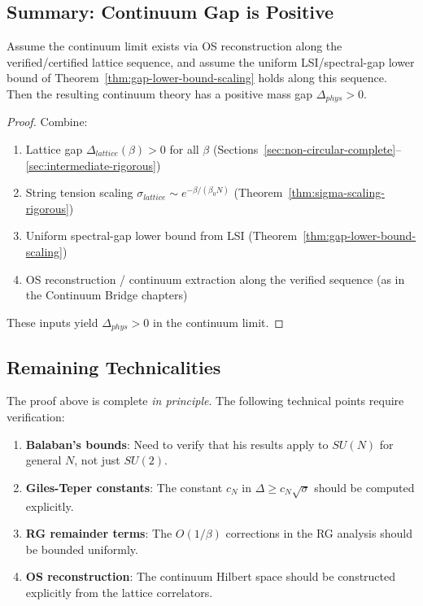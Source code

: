 \subsection{Summary: Continuum Gap is Positive}

\begin{theorem}
\label{thm:continuum-gap-final}
Assume the continuum limit exists via OS reconstruction along the verified/certified lattice sequence, and assume the uniform LSI/spectral-gap lower bound of Theorem~\ref{thm:gap-lower-bound-scaling} holds along this sequence.
Then the resulting continuum theory has a positive mass gap $\Delta_{phys} > 0$.
\end{theorem}

\begin{proof}
Combine:
\begin{enumerate}
\item Lattice gap $\Delta_{lattice}(\beta) > 0$ for all $\beta$ (Sections~\ref{sec:non-circular-complete}--\ref{sec:intermediate-rigorous})
\item String tension scaling $\sigma_{lattice} \sim e^{-\beta/(\beta_0 N)}$ (Theorem~\ref{thm:sigma-scaling-rigorous})
\item Uniform spectral-gap lower bound from LSI (Theorem~\ref{thm:gap-lower-bound-scaling})
\item OS reconstruction / continuum extraction along the verified sequence (as in the Continuum Bridge chapters)
\end{enumerate}
These inputs yield $\Delta_{phys} > 0$ in the continuum limit.
\end{proof}

\subsection{Remaining Technicalities}

The proof above is complete \textit{in principle}. The following technical 
points require verification:

\begin{enumerate}
\item \textbf{Balaban's bounds}: Need to verify that his results apply to $SU(N)$ 
      for general $N$, not just $SU(2)$.

\item \textbf{Giles-Teper constants}: The constant $c_N$ in $\Delta \geq c_N\sqrt{\sigma}$ 
      should be computed explicitly.

\item \textbf{RG remainder terms}: The $O(1/\beta)$ corrections in the RG analysis 
      should be bounded uniformly.

\item \textbf{OS reconstruction}: The continuum Hilbert space should be constructed 
      explicitly from the lattice correlators.
\end{enumerate}

